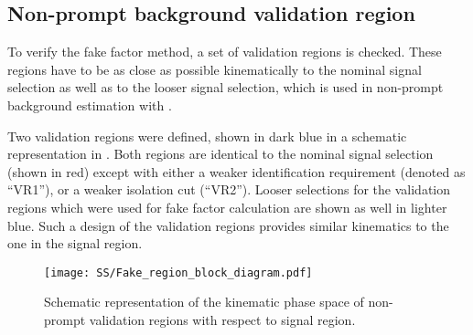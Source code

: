 \subsection{Non-prompt background validation region}
\label{subsec:fake_validation}

To verify the fake factor method, a set of validation regions is checked. 
These regions have to be as close as possible kinematically to
the nominal signal selection as well as to the looser signal selection, 
which is used in non-prompt background estimation with .

Two validation regions were defined, shown in dark blue in a schematic representation in . 
Both regions are identical to the nominal signal selection (shown in red) 
except with either a weaker identification requirement (denoted as ``VR1''), or a weaker isolation cut (``VR2'').
Looser selections for the validation regions which were used for fake factor calculation are shown as well in lighter blue. Such a design of the validation regions provides similar kinematics to the one in the signal region.

\begin{figure}[h]
\begin{center}
\texttt{[image: SS/Fake\_region\_block\_diagram.pdf]}
\caption{Schematic representation of the kinematic phase space of non-prompt validation regions with respect to signal region.}
\label{fig:fake_validation_regions}
\end{center}
\end{figure}


